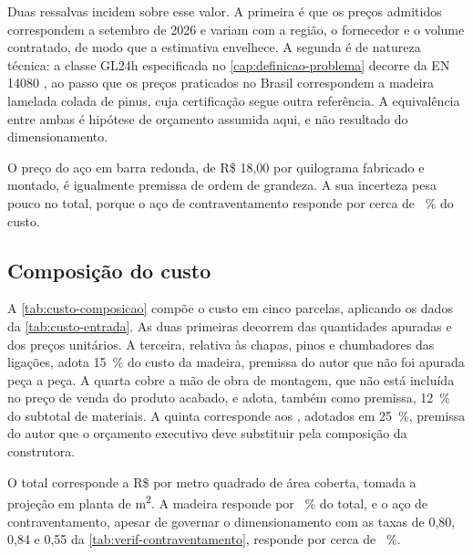 Duas ressalvas incidem sobre esse valor. A primeira é que os preços admitidos
correspondem a setembro de 2026 e variam com a região, o fornecedor e o
volume contratado, de modo que a estimativa envelhece. A segunda é de natureza
técnica: a classe GL24h especificada no \autoref{cap:definicao-problema} decorre
da EN 14080 \cite{EN14080:2013}, ao passo que os preços praticados no Brasil
correspondem a madeira lamelada colada de pinus, cuja
certificação segue outra referência. A equivalência entre ambas é hipótese de
orçamento assumida aqui, e não resultado do dimensionamento.

O preço do aço em barra redonda, de R\$ 18,00 por quilograma fabricado e
montado, é igualmente premissa de ordem de grandeza. A sua incerteza pesa pouco
no total, porque o aço de contraventamento responde por cerca de
\custoPctAco~\% do custo.


\subsection{Composição do custo}\label{ssec:custo-composicao}

A \autoref{tab:custo-composicao} compõe o custo em cinco parcelas, aplicando os
dados da \autoref{tab:custo-entrada}. As duas
primeiras decorrem das quantidades apuradas e dos preços unitários. A terceira,
relativa às chapas, pinos e chumbadores das ligações, adota 15~\% do
custo da madeira, premissa do autor que não foi apurada peça a peça.
A quarta cobre a mão de obra de montagem, que não está incluída no preço de
venda do produto acabado, e adota, também como premissa, 12~\% do subtotal de materiais. A
quinta corresponde aos ,
adotados em 25~\%, premissa do autor que o orçamento executivo deve
substituir pela composição da construtora.



O total corresponde a R\$ \custoPorMetro{} por metro quadrado de área coberta,
tomada a projeção em planta de \custoArea{} m\textsuperscript{2}. A madeira
responde por \custoPctMadeira~\% do total, e o aço de contraventamento, apesar de
governar o dimensionamento com as taxas de 0,80, 0,84 e 0,55 da
\autoref{tab:verif-contraventamento}, responde por cerca de \custoPctAco~\%.

